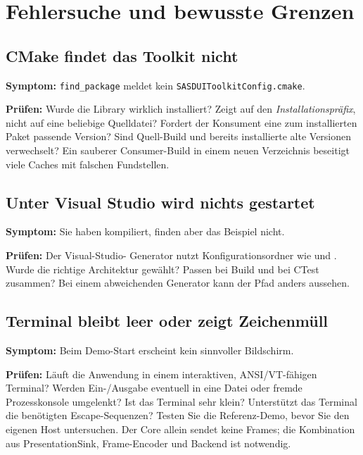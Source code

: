 \chapter{Fehlersuche und bewusste Grenzen}\label{chap:trouble}

\section{CMake findet das Toolkit nicht}
\textbf{Symptom:} \texttt{find\_package} meldet
kein \texttt{SASDUIToolkitConfig.cmake}.

\textbf{Prüfen:} Wurde die Library wirklich
installiert? Zeigt 
auf den \emph{Installationspräfix}, nicht
auf eine beliebige Quelldatei?
Fordert der Konsument eine zum
installierten Paket passende Version?
Sind Quell-Build und bereits
installierte alte Versionen verwechselt?
Ein sauberer Consumer-Build in einem
neuen Verzeichnis beseitigt viele
Caches mit falschen Fundstellen.

\section{Unter Visual Studio wird nichts gestartet}
\textbf{Symptom:} Sie haben kompiliert,
finden aber das Beispiel nicht.

\textbf{Prüfen:} Der Visual-Studio-
Generator nutzt Konfigurationsordner
wie  und
. Wurde die
richtige Architektur gewählt?
Passen 
bei Build und 
bei CTest zusammen?
Bei einem abweichenden Generator
kann der Pfad anders aussehen.

\section{Terminal bleibt leer oder zeigt Zeichenmüll}
\textbf{Symptom:} Beim Demo-Start
erscheint kein sinnvoller Bildschirm.

\textbf{Prüfen:} Läuft die Anwendung
in einem interaktiven, ANSI/VT-fähigen
Terminal? Werden Ein-/Ausgabe eventuell
in eine Datei oder fremde Prozesskonsole
umgelenkt? Ist das Terminal sehr klein?
Unterstützt das Terminal die
benötigten Escape-Sequenzen?
Testen Sie die Referenz-Demo, bevor
Sie den eigenen Host untersuchen.
Der Core allein sendet keine Frames;
die Kombination aus PresentationSink,
Frame-Encoder und Backend ist notwendig.

